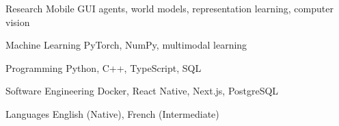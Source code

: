 

\begin{cvskills}

  \cvskill
    {Research} %
    {Mobile GUI agents, world models, representation learning, computer vision} %

  \cvskill
    {Machine Learning} %
    {PyTorch, NumPy, multimodal learning} %

  \cvskill
    {Programming} %
    {Python, C++, TypeScript, SQL} %

  \cvskill
    {Software Engineering} %
    {Docker, React Native, Next.js, PostgreSQL} %

  \cvskill
    {Languages} %
    {English (Native), French (Intermediate)} %

\end{cvskills}
